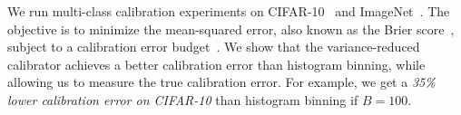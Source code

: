 We run multi-class calibration experiments on CIFAR-10~\cite{krizhevsky2009learningmultiple} and ImageNet~\cite{deng2009imagenet}.
The objective is to minimize the mean-squared error, also known as the Brier score~\cite{brier1950verification}, subject to a calibration error budget~\cite{gneiting2005weather}.
We show that the variance-reduced calibrator achieves a better calibration error than histogram binning, while allowing us to measure the true calibration error.
For example, we get a \emph{35\% lower calibration error on CIFAR-10} than histogram binning if $B = 100$.


